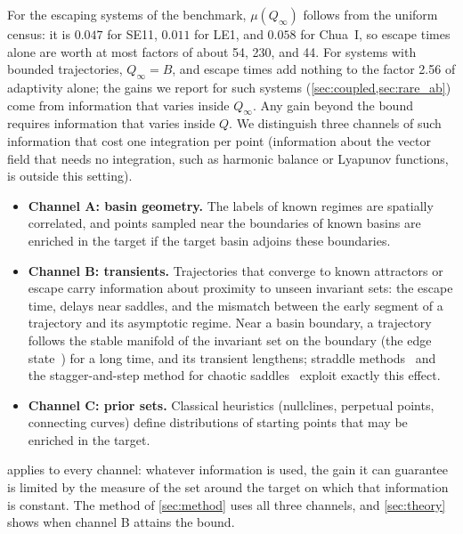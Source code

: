 For the escaping systems of the benchmark, $\mu(Q_\infty)$ follows from the uniform census: it is $0.047$ for SE11, $0.011$ for LE1, and $0.058$ for Chua~I, so escape times alone are worth at most factors of about 54, 230, and 44. For systems with bounded trajectories, $Q_\infty=B$, and escape times add nothing to the factor 2.56 of adaptivity alone; the gains we report for such systems (\cref{sec:coupled,sec:rare_ab}) come from information that varies inside $Q_\infty$. Any gain beyond the bound requires information that varies inside $Q$. We distinguish three channels of such information that cost one integration per point (information about the vector field that needs no integration, such as harmonic balance or Lyapunov functions, is outside this setting).
\begin{itemize}
\item \textbf{Channel A: basin geometry.} The labels of known regimes are spatially correlated, and points sampled near the boundaries of known basins are enriched in the target if the target basin adjoins these boundaries.
\item \textbf{Channel B: transients.} Trajectories that converge to known attractors or escape carry information about proximity to unseen invariant sets: the escape time, delays near saddles, and the mismatch between the early segment of a trajectory and its asymptotic regime. Near a basin boundary, a trajectory follows the stable manifold of the invariant set on the boundary (the edge state~\cite{Skufca2006Edge,Schneider2007Edge,Vollmer2009Edge}) for a long time, and its transient lengthens; straddle methods~\cite{NusseYorke1989} and the stagger-and-step method for chaotic saddles~\cite{SweetNusseYorke2001} exploit exactly this effect.
\item \textbf{Channel C: prior sets.} Classical heuristics (nullclines, perpetual points, connecting curves) define distributions of starting points that may be enriched in the target.
\end{itemize}
 applies to every channel: whatever information is used, the gain it can guarantee is limited by the measure of the set around the target on which that information is constant. The method of \cref{sec:method} uses all three channels, and \cref{sec:theory} shows when channel B attains the bound.
